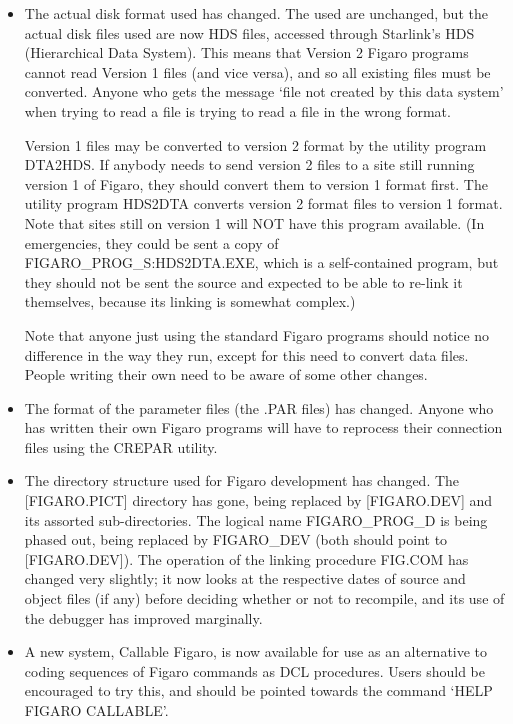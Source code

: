 \begin{itemize}
\item The actual disk format used has changed. The used are unchanged, but the
actual disk files used are now HDS files, accessed through Starlink's HDS
(Hierarchical Data System). This means that Version 2 Figaro programs cannot
read Version 1 files (and vice versa), and so all existing files must be
converted. Anyone who gets the message `file not created by this data system'
when trying to read a file is trying to read a file in the wrong format.

Version 1 files may be converted to version 2 format by the utility program
DTA2HDS. If anybody needs to send version 2 files to a site still running
version 1 of Figaro, they should convert them to version 1 format first. The
utility program HDS2DTA converts version 2 format files to version 1 format.
Note that sites still on version 1 will NOT have this program available. (In
emergencies, they could be sent a copy of FIGARO\_PROG\_S:HDS2DTA.EXE, which is
a self-contained program, but they should not be sent the source and expected
to be able to re-link it themselves, because its linking is somewhat complex.)

Note that anyone just using the standard Figaro programs should notice no
difference in the way they run, except for this need to convert data files.
People writing their own need to be aware of some other changes.

\item The format of the parameter files (the .PAR files) has changed. Anyone
who has written their own Figaro programs will have to reprocess their
connection files using the CREPAR utility.

\item The directory structure used for Figaro development has changed. The
[FIGARO.PICT] directory has gone, being replaced by [FIGARO.DEV] and its
assorted sub-directories. The logical name FIGARO\_PROG\_D is being phased out,
being replaced by FIGARO\_DEV (both should point to [FIGARO.DEV]). The operation
of the linking procedure FIG.COM has changed very slightly; it now looks at the
respective dates of source and object files (if any) before deciding whether or
not to recompile, and its use of the debugger has improved marginally.

\item A new system, Callable Figaro, is now available for use as an alternative
to coding sequences of Figaro commands as DCL procedures. Users should be
encouraged to try this, and should be pointed towards the command `HELP FIGARO
CALLABLE'.

\end{itemize}

